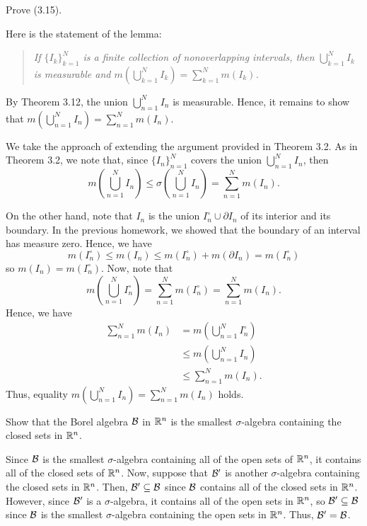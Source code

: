 \begin{problem}
  Prove (3.15).
\end{problem}
\begin{solution}
  Here is the statement of the lemma:
  \begin{quote}
    \emph{If \({\{I_k\}}_{k=1}^{N}\) is a finite collection of
      nonoverlapping intervals, then \(\bigcup_{k=1}^NI_k\) is measurable
      and \(m\left(\bigcup_{k=1}^NI_k\right)=\sum_{k=1}^Nm(I_k)\).}
  \end{quote}
  By Theorem 3.12, the union \(\bigcup_{n=1}^N I_n\) is measurable. Hence,
  it remains to show that
  \(m\left(\bigcup_{n=1}^NI_n\right)=\sum_{n=1}^Nm(I_n)\).

  We take the approach of extending the argument provided in Theorem
  3.2. As in Theorem 3.2, we note that, since \({\{I_n\}}_{n=1}^N\) covers
  the union \(\bigcup_{n=1}^N I_n\), then
  \[
    m\left(\bigcup_{n=1}^N I_n\right)\leq \sigma%
    \left(\bigcup_{n=1}^N I_n\right)=\sum_{n=1}^N m(I_n).
  \]

  On the other hand, note that \(I_n\) is the union
  \(I_n^\circ\cup\partial I_n\) of its interior and its boundary. In the
  previous homework, we showed that the boundary of an interval has measure
  zero. Hence, we have
  \[
    m(I_n^\circ)\leq m(I_n)\leq m(I_n^\circ)+m(\partial I_n)=m(I_n^\circ)
  \]
  so \(m(I_n)=m(I_n^\circ)\). Now, note that
  \[
    m\left(\bigcup_{n=1}^N I_n^\circ\right)=%
    \sum_{n=1}^N m(I_n^\circ)=%
    \sum_{n=1}^N m(I_n).
  \]
  Hence, we have
  \begin{align*}
    \sum_{n=1}^N m(I_n)
    &=m\left(\bigcup_{n=1}^N I_n^\circ\right)\\
    &\leq m\left(\bigcup_{n=1}^N I_n\right)\\
    &\leq \sum_{n=1}^N m(I_n).
  \end{align*}
  Thus, equality \(m\left(\bigcup_{n=1}^NI_n\right)=\sum_{n=1}^Nm(I_n)\)
  holds.
\end{solution}

\begin{problem}
  Show that the Borel algebra \(\mathcal{B}\) in \(\mathbb{R}^n\) is the smallest
  \(\sigma\)-algebra containing the closed sets in \(\mathbb{R}^n\).
\end{problem}
\begin{solution}
  Since \(\mathcal{B}\) is the smallest \(\sigma\)-algebra containing all of the
  open sets of \(\mathbb{R}^n\), it contains all of the closed sets of
  \(\mathbb{R}^n\). Now, suppose that \(\mathcal{B}'\) is another \(\sigma\)-algebra
  containing the closed sets in \(\mathbb{R}^n\). Then, \(\mathcal{B}'\subseteq\mathcal{B}\)
  since \(\mathcal{B}\) contains all of the closed sets in \(\mathbb{R}^n\). However,
  since \(\mathcal{B}'\) is a \(\sigma\)-algebra, it contains all of the open
  sets in \(\mathbb{R}^n\), so \(\mathcal{B}'\subseteq\mathcal{B}\) since \(\mathcal{B}\) is the
  smallest \(\sigma\)-algebra containing the open sets in \(\mathbb{R}^n\). Thus,
  \(\mathcal{B}'=\mathcal{B}\).
\end{solution}

